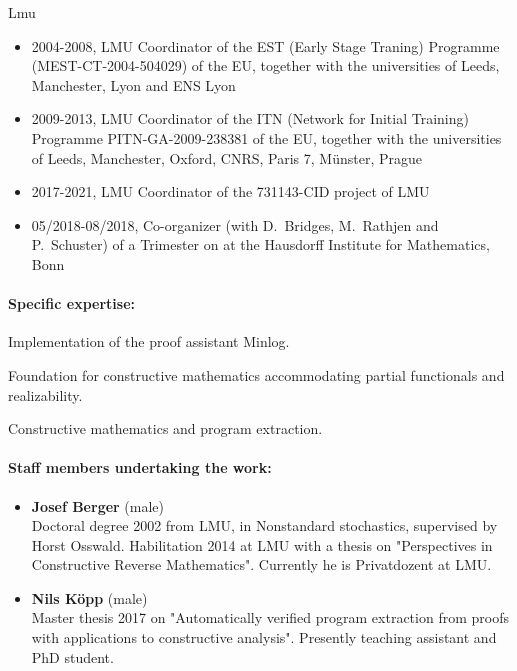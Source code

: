 \begin{sitedescription}{Lmu}
\begin{itemize}
\item 2004-2008, LMU Coordinator of the  EST (Early Stage Traning) Programme
   (MEST-CT-2004-504029) of the EU, together with the
universities of Leeds, Manchester, Lyon and ENS Lyon

\item 2009-2013, LMU Coordinator of the ITN (Network for Initial
    Training) Programme PITN-GA-2009-238381  of the
    EU, together with the universities of Leeds, Manchester, Oxford,
    CNRS, Paris 7, M\"unster, Prague

\item 2017-2021, LMU Coordinator of the 731143-CID project of LMU

\item 05/2018-08/2018, Co-organizer (with D.~Bridges, M.~Rathjen and
  P.~Schuster) of a Trimester on 
  at the Hausdorff Institute for Mathematics, Bonn
\end{itemize}
\paragraph{Specific expertise:}
\begin{compactitem}
\item Implementation of the proof assistant Minlog.
\item Foundation for constructive mathematics accommodating partial functionals and realizability.
\item Constructive mathematics and program extraction.
\end{compactitem}

\paragraph{Staff members undertaking the work:}

\begin{itemize}

\item \textbf{Josef Berger} (male)\\
Doctoral degree 2002 from LMU, in Nonstandard
stochastics, supervised by Horst Osswald.  Habilitation 2014 at LMU
with a thesis on "Perspectives in Constructive Reverse Mathematics".
Currently he is Privatdozent at LMU.

\item \textbf{Nils K\"opp} (male)\\
Master thesis 2017 on "Automatically verified program
extraction from proofs with applications to constructive analysis".
Presently teaching assistant and PhD student.


\end{itemize}
\end{sitedescription}
